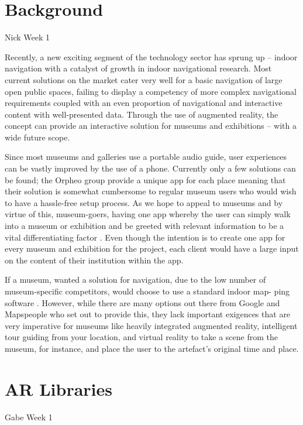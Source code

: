 \section{Background}
Nick Week 1

Recently, a new exciting segment of the technology sector has sprung up – indoor navigation with a catalyst of growth in indoor navigational research. Most current solutions on the market cater very well for a basic navigation of large open public spaces, failing to display a competency of more complex navigational requirements coupled with an even proportion of navigational and interactive content with well-presented data. Through the use of augmented reality, the concept can provide an interactive solution for museums and exhibitions – with a wide future scope.

Since most museums and galleries use a portable audio guide, user experiences can be vastly improved by the use of a phone. Currently only a few solutions can be found; the Orpheo group \cite{orpheo} provide a unique app for each place meaning that their solution is somewhat cumbersome to regular museum users who would wish to have a hassle-free setup process. As we hope to appeal to museums and by virtue of this, museum-goers, having one app whereby the user can simply walk into a museum or exhibition and be greeted with relevant information to be a vital differentiating factor \cite{microsoft}. Even though the intention is to create one app for every museum and exhibition for the project, each client would have a large input on the content of their institution within the app. 

If a museum, wanted a solution for navigation, due to the low number of museum-specific competitors, would choose to use a standard indoor map- ping software \cite{murphy}. However, while there are many options out there from Google and Mapspeople \cite{mapspeople} who set out to provide this, they lack important exigences that are very imperative for museums like heavily integrated augmented reality, intelligent tour guiding from your location, and virtual reality to take a scene from the museum, for instance, and place the user to the artefact’s original time and place. 

\section{AR Libraries}
Gabe Week 1

